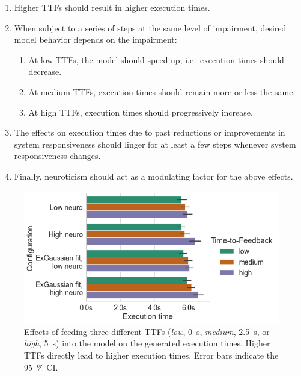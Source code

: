 \begin{enumerate}
    \item\label{it:ttftoexectime} Higher \acp{TTF} should result in higher execution times.
    \item\label{it:duration} When subject to a series of steps at the same level of impairment, desired model behavior depends on the impairment:
    \begin{enumerate}
        \item At low \acp{TTF}, the model should speed up; i.e.\ execution times should decrease.
        \item At medium \acp{TTF}, execution times should remain more or less the same.
        \item At high \acp{TTF}, execution times should progressively increase.
    \end{enumerate}
    \item The effects on execution times due to past reductions or improvements in system responsiveness should linger for at least a few steps whenever system responsiveness changes.
    \item\label{it:neuro} Finally, neuroticism should act as a modulating factor for the above effects.
\end{enumerate}

\begin{figure}
    \centering
    \includegraphics[width=\columnwidth]{figs/new_model/ttf_to_exectime.png}
    \caption{%
        Effects of feeding three different \acp{TTF} (\emph{low}, \SI{0}{\second}, \emph{medium}, \SI{2.5}{\second}, or \emph{high}, \SI{5}{\second}) into the model on the generated execution times.
        Higher \acp{TTF} directly lead to higher execution times.
        Error bars indicate the \SI{95}{\percent} \ac{CI}.
    }\label{fig:ttf_to_exectime}
\end{figure}

